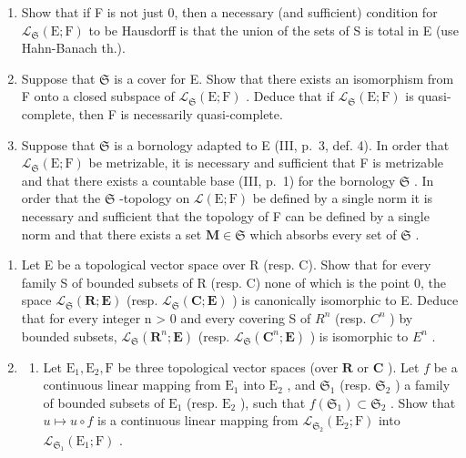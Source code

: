 \begin{enumerate}
\def\labelenumi{\alph{enumi})}
\item
  Show that if F is not just 0, then a necessary (and sufficient) condition for \(\mathcal{L}_{\mathfrak{S}}(\mathrm{E};\mathrm{F})\) to be Hausdorff is that the union of the sets of S is total in E (use Hahn-Banach th.).
\item
  Suppose that \(\mathfrak{S}\) is a cover for E. Show that there exists an isomorphism from F onto a closed subspace of \(\mathcal{L}_{\mathfrak{S}}(\mathrm{E};\mathrm{F})\) . Deduce that if \(\mathcal{L}_{\mathfrak{S}}(\mathrm{E};\mathrm{F})\) is quasi-complete, then F is necessarily quasi-complete.
\item
  Suppose that \(\mathfrak{S}\) is a bornology adapted to E (III, p.~3, def. 4). In order that \(\mathcal{L}_{\mathfrak{S}}(\mathrm{E};\mathrm{F})\) be metrizable, it is necessary and sufficient that F is metrizable and that there exists a countable base (III, p.~1) for the bornology \(\mathfrak{S}\) . In order that the \(\mathfrak{S}\) -topology on \(\mathcal{L}(\mathrm{E};\mathrm{F})\) be defined by a single norm it is necessary and sufficient that the topology of F can be defined by a single norm and that there exists a set \(\mathbf{M} \in \mathfrak{S}\) which absorbs every set of \(\mathfrak{S}\) .
\end{enumerate}

\begin{enumerate}
\def\labelenumi{\arabic{enumi})}
\setcounter{enumi}{2}
\item
  Let E be a topological vector space over R (resp. C). Show that for every family S of bounded subsets of R (resp. C) none of which is the point 0, the space \(\mathcal{L}_{\mathfrak{S}}(\mathbf{R};\mathbf{E})\) (resp. \(\mathcal{L}_{\mathfrak{S}}(\mathbf{C};\mathbf{E})\) ) is canonically isomorphic to E. Deduce that for every integer n \textgreater{} 0 and every covering S of \(R^{n}\) (resp. \(C^{n}\) ) by bounded subsets, \(\mathcal{L}_{\mathfrak{S}}(\mathbf{R}^{n};\mathbf{E})\) (resp. \(\mathcal{L}_{\mathfrak{S}}(\mathbf{C}^{n};\mathbf{E})\) ) is isomorphic to \(E^{n}\) .
\item
  \begin{enumerate}
  \def\labelenumii{\alph{enumii})}
  \tightlist
  \item
    Let \(\mathrm{E}_1, \mathrm{E}_2, \mathrm{F}\) be three topological vector spaces (over \(\mathbf{R}\) or \(\mathbf{C}\) ). Let \(f\) be a continuous linear mapping from \(\mathrm{E}_1\) into \(\mathrm{E}_2\) , and \(\mathfrak{S}_1\) (resp. \(\mathfrak{S}_2\) ) a family of bounded subsets of \(\mathrm{E}_1\) (resp. \(\mathrm{E}_2\) ), such that \(f(\mathfrak{S}_1) \subset \mathfrak{S}_2\) . Show that \(u \mapsto u \circ f\) is a continuous linear mapping from \(\mathcal{L}_{\mathfrak{S}_2}(\mathrm{E}_2; \mathrm{F})\) into \(\mathcal{L}_{\mathfrak{S}_1}(\mathrm{E}_1; \mathrm{F})\) .
  \end{enumerate}
\end{enumerate}

